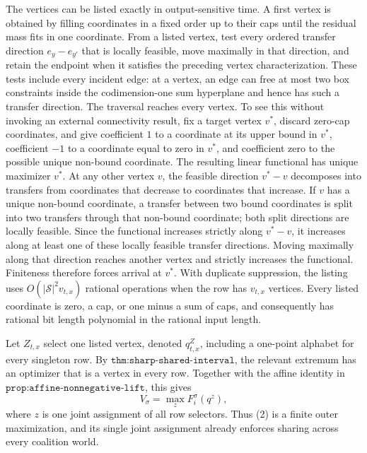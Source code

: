 The vertices can be listed exactly in output-sensitive time.  A first vertex is obtained by filling coordinates in a fixed order up to their caps until the residual mass fits in one coordinate.  From a listed vertex, test every ordered transfer direction \(e_y-e_{y'}\) that is locally feasible, move maximally in that direction, and retain the endpoint when it satisfies the preceding vertex characterization.  These tests include every incident edge: at a vertex, an edge can free at most two box constraints inside the codimension-one sum hyperplane and hence has such a transfer direction.  The traversal reaches every vertex.  To see this without invoking an external connectivity result, fix a target vertex \(v^*\), discard zero-cap coordinates, and give coefficient \(1\) to a coordinate at its upper bound in \(v^*\), coefficient \(-1\) to a coordinate equal to zero in \(v^*\), and coefficient zero to the possible unique non-bound coordinate.  The resulting linear functional has unique maximizer \(v^*\).  At any other vertex \(v\), the feasible direction \(v^*-v\) decomposes into transfers from coordinates that decrease to coordinates that increase.  If \(v\) has a unique non-bound coordinate, a transfer between two bound coordinates is split into two transfers through that non-bound coordinate; both split directions are locally feasible.  Since the functional increases strictly along \(v^*-v\), it increases along at least one of these locally feasible transfer directions.  Moving maximally along that direction reaches another vertex and strictly increases the functional.  Finiteness therefore forces arrival at \(v^*\).  With duplicate suppression, the listing uses \(O(|\mathcal S|^2v_{t,x})\) rational operations when the row has \(v_{t,x}\) vertices.  Every listed coordinate is zero, a cap, or one minus a sum of caps, and consequently has rational bit length polynomial in the rational input length.

Let \(Z_{t,x}\) select one listed vertex, denoted \(q^{Z}_{t,x}\), including a one-point alphabet for every singleton row.  By \(\texttt{thm:sharp-shared-interval}\), the relevant extremum has an optimizer that is a vertex in every row.  Together with the affine identity in \(\texttt{prop:affine-nonnegative-lift}\), this gives
\[
 V_\sigma=\max_z F_i^\sigma(q^z),
 \tag{2}
\]
where \(z\) is one joint assignment of all row selectors.  Thus (2) is a finite outer maximization, and its single joint assignment already enforces sharing across every coalition world.

